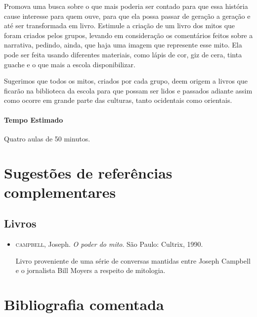 \documentclass[11pt]{extarticle}
\begin{document}
Promova uma busca sobre o que mais poderia ser contado para que essa história cause interesse para quem ouve, para que ela possa passar de geração a geração e até ser transformada em livro. Estimule a criação de um livro dos mitos que foram criados pelos grupos, levando em consideração os comentários feitos sobre a narrativa, pedindo, ainda, que haja uma imagem que represente esse mito. Ela pode ser feita usando diferentes materiais, como lápis de cor, giz de cera, tinta guache e o que mais a escola disponibilizar. 

Sugerimos que todos os mitos, criados por cada grupo, deem origem a  livros que ficarão na biblioteca da escola para que possam ser lidos e passados adiante assim como ocorre em grande parte das culturas, tanto ocidentais como orientais.

\paragraph{Tempo Estimado} Quatro aulas de 50 minutos.



\section{Sugestões de referências complementares}

\subsection{Livros} 

\begin{itemize}
\item \textsc{campbell}, Joseph. \textit{O poder do mito}. São Paulo: Cultrix, 1990.

Livro proveniente de uma série de conversas mantidas entre Joseph Campbell e o jornalista Bill Moyers a respeito de mitologia.
\end{itemize}

\section{Bibliografia comentada}
\end{document}
